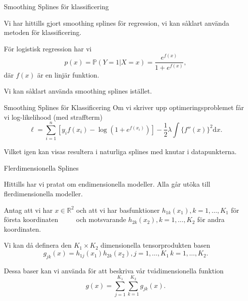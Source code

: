 \documentclass[10pt,english]{beamer}
\begin{document}
\begin{frame}{Smoothing Splines för klassificering}
    
    Vi har hittills gjort smoothing splines för regression, vi kan såklart använda metoden för klassificering.

    För logistisk regression har vi
    \begin{equation*}
        p(x) = \mathbb{P}(Y = 1 | X = x) = \frac{e^{f(x)}}{1 + e^{f(x)}},
    \end{equation*}
    där $f(x)$ är en linjär funktion.

    Vi kan såklart använda smoothing splines istället.

\end{frame}

\begin{frame}{Smoothing Splines för Klassificering}
    Om vi skriver upp optimeringsproblemet får vi log-likelihood (med straffterm)
    \begin{equation*}
        \ell = \sum_{i=1}^{n} \left[y_i f(x_i) - \log(1 + e^{f(x_i)}) \right] - \frac{1}{2}\lambda \int \{ f''(x)\}^2 \mathrm{d}x.
    \end{equation*}

    Vilket igen kan visas resultera i naturliga splines med knutar i datapunkterna.
\end{frame}

\begin{frame}{Flerdimensionella Splines}
    
    Hittills har vi pratat om endimensionella modeller. Alla går utöka till flerdimensionella modeller.

    Antag att vi har $x \in \mathbb{R}^2$ och att vi har basfunktioner $h_{1k}(x_1), k = 1, \ldots, K_1$ för första koordinaten $\qquad$ och motsvarande $h_{2k}(x_2), k = 1, \ldots, K_2$ för andra koordinaten.

    Vi kan då definera den $K_1 \times K_2$ dimensionella tensorprodukten basen
    \begin{equation*}
        g_{jk}(x) = h_{1j}(x_1)h_{2k}(x_2), j = 1,\ldots,K_1 \, k = 1, \ldots, K_2.
    \end{equation*}

    Dessa baser kan vi använda för att beskriva vår tvådimensionella funktion
    \begin{equation*}
        g(x) = \sum_{j=1}^{K_1} \sum_{k=1}^{K_2} g_{jk}(x).
    \end{equation*}

\end{frame}
\end{document}

